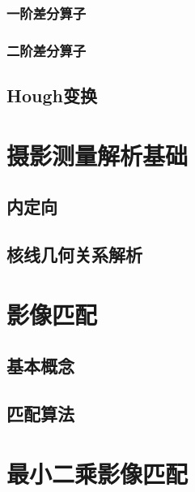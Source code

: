 \documentclass[12pt,a4paper]{article}
\begin{document}
\subsubsection{一阶差分算子}
\subsubsection{二阶差分算子}

\subsection{Hough变换}

\section{摄影测量解析基础}
\subsection{内定向}
\subsection{核线几何关系解析}

\section{影像匹配}
\subsection{基本概念}
\subsection{匹配算法}

\section{最小二乘影像匹配}
\end{document}
